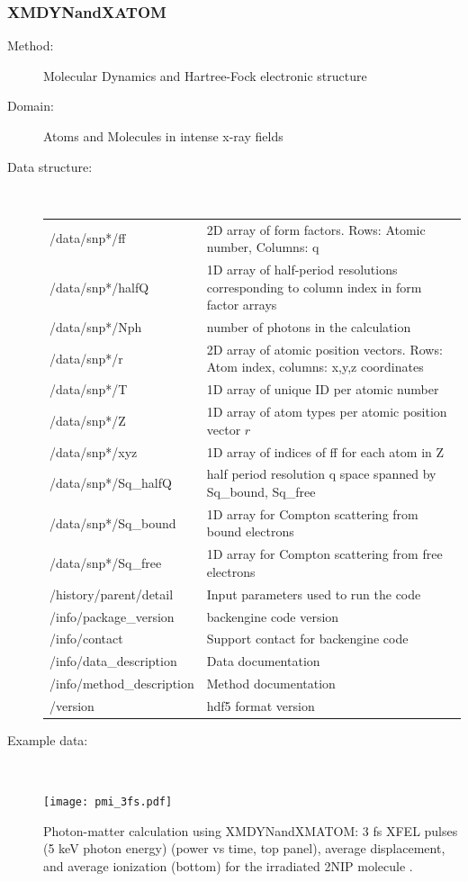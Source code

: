 \documentclass[12pt]{scrartcl}
\begin{document}
\subsubsection{XMDYNandXATOM\label{sec:interface_pmi_xmdyn}}
\begin{description}
  \item[Method:] Molecular Dynamics and Hartree-Fock electronic structure
  \item[Domain:] Atoms and Molecules in intense x-ray fields
  \item[Data structure:]\ \\
{\scriptsize%
\begin{tabular}{l|l}
  \hline
  \hline
  /data/snp*/ff        & 2D array of form factors. Rows: Atomic number, Columns: q  \\
  /data/snp*/halfQ        & 1D array of half-period resolutions corresponding to
  column index in form factor arrays \\
  /data/snp*/Nph        & number of photons in the calculation \\
  /data/snp*/r        & 2D array of atomic position vectors. Rows: Atom index,
  columns: x,y,z coordinates \\
  /data/snp*/T        & 1D array of unique ID per atomic number \\
  /data/snp*/Z        &  1D array of atom types per atomic position vector
  $r$\\
  /data/snp*/xyz        & 1D array of indices of ff for each atom in Z \\
  /data/snp*/Sq\_halfQ        & half period resolution q space spanned by
  Sq\_bound, Sq\_free \\
  /data/snp*/Sq\_bound        & 1D array for Compton scattering from bound electrons \\
  /data/snp*/Sq\_free        & 1D array for Compton scattering from free
  electrons \\
  /history/parent/detail        & Input parameters used to run the code \\
  /info/package\_version        & backengine code version \\
  /info/contact        & Support contact for backengine code \\
  /info/data\_description        & Data documentation \\
  /info/method\_description        & Method documentation \\
  /version                   & hdf5 format version \\
  \hline
  \hline
\end{tabular}
}
\item[Example data:]\ \\
      \begin{center}
        \texttt{[image: pmi\_3fs.pdf]}
      \end{center}
      \scriptsize{Photon-matter calculation using XMDYNandXMATOM:
        3 fs XFEL pulses (5 keV photon energy) (power vs time, top panel), average displacement, and average ionization
        (bottom) \cite{Fortmann-Grote2016b} for the irradiated 2NIP molecule \cite{Schlessman1998}.}
\end{description}
%
\end{document}
